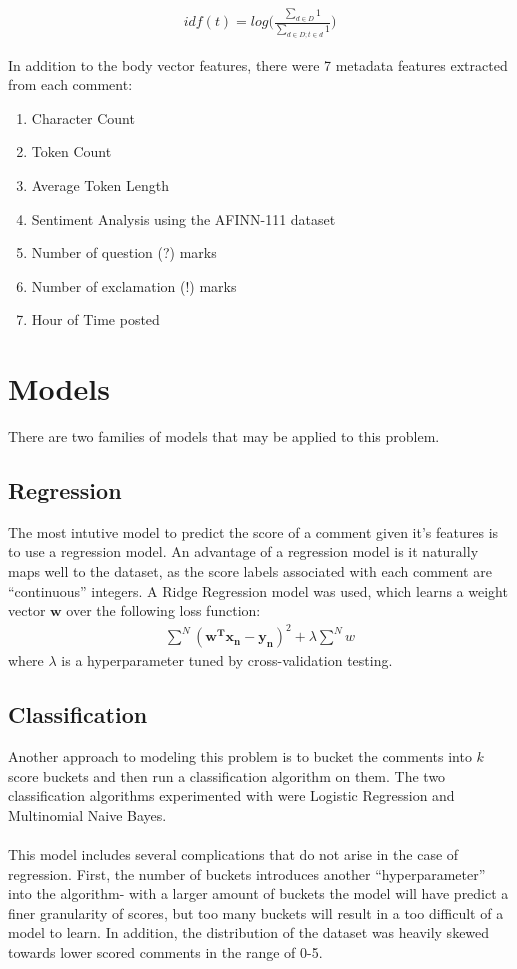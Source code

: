 \documentclass[11pt, twocolumn]{article}
\begin{document}
	\begin{gather*}
		idf(t) = log \bigg( \frac{\sum_{d \in D}{1}}{\sum_{d \in D; t \in d}{1}} \bigg)
	\end{gather*}
		
	In addition to the body vector features, there were 7 metadata features extracted from each comment:
	\begin{enumerate}
		\setlength\itemsep{0em}
		\item Character Count
		\item Token Count
		\item Average Token Length
		\item Sentiment Analysis using the AFINN-111 dataset \cite{sentiment} 
		\item Number of question (?) marks
		\item Number of exclamation (!) marks
		\item Hour of Time posted
	\end{enumerate}

\section{Models}
	There are two families of models that may be applied to this problem.
	
	\subsection{Regression}
	The most intutive model to predict the score of a comment given it's features is to use a regression model. An advantage of a regression model is it naturally maps well to the dataset, as the score labels associated with each comment are ``continuous'' integers. A Ridge Regression model was used, which learns a weight vector $\mathbf{w}$ over the following loss function:
	\begin{gather*}
		\sum^N{ (\mathbf{w^T} \mathbf{x_n} - \mathbf{y_n})^2} + \lambda \sum^N{ w }
	\end{gather*}
	where $\lambda$ is a hyperparameter tuned by cross-validation testing.
	
	\subsection{Classification}
	Another approach to modeling this problem is to bucket the comments into $k$ score buckets and then run a classification algorithm on them. The two classification algorithms experimented with were Logistic Regression and Multinomial Naive Bayes. \\
	\\ 
	This model includes several complications that do not arise in the case of regression. First, the number of buckets introduces another ``hyperparameter'' into the algorithm- with a larger amount of buckets the model will have predict a finer granularity of scores, but too many buckets will result in a too difficult of a model to learn. In addition, the distribution of the dataset was heavily skewed towards lower scored comments in the range of 0-5.
		
\end{document}
